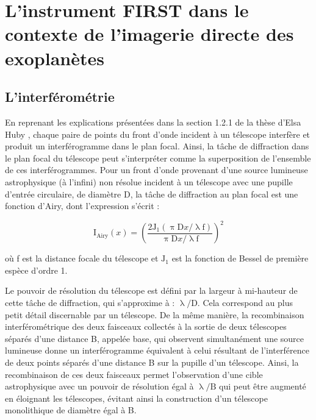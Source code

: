 \section{L'instrument FIRST dans le contexte de l'imagerie directe des exoplanètes}

\subsection{L'interférométrie}

En reprenant les explications présentées dans la section 1.2.1 de la thèse d'Elsa Huby \citep{huby2013these}, chaque paire de points du front d'onde incident à un télescope interfère et produit un interférogramme dans le plan focal. Ainsi, la tâche de diffraction dans le plan focal du télescope peut s'interpréter comme la superposition de l'ensemble de ces interférogrammes. Pour un front d'onde provenant d'une source lumineuse astrophysique (à l'infini) non résolue incident à un télescope avec une pupille d'entrée circulaire, de diamètre D, la tâche de diffraction au plan focal est une fonction d'Airy, dont l'expression s'écrit :

\begin{equation}
    \text{I}_{\text{Airy}}(x) = \left( \frac{2 \text{J}_{1} (\uppi \text{D}x / \uplambda \text{f})}{\uppi \text{D}x / \uplambda \text{f}} \right)^2
\end{equation}

\noindent où f est la distance focale du télescope et $\text{J}_{1}$ est la fonction de Bessel de première espèce d'ordre 1.

Le pouvoir de résolution du télescope est défini par la largeur à mi-hauteur de cette tâche de diffraction, qui s'approxime à : $\uplambda / \text{D}$. Cela correspond au plus petit détail discernable par un télescope. De la même manière, la recombinaison interférométrique des deux faisceaux collectés à la sortie de deux télescopes séparés d'une distance B, appelée base, qui observent simultanément une source lumineuse donne un interférogramme équivalent à celui résultant de l'interférence de deux points séparés d'une distance B sur la pupille d'un télescope. Ainsi, la recombinaison de ces deux faisceaux permet l'observation d'une cible astrophysique avec un pouvoir de résolution égal à $\uplambda / \text{B}$ qui peut être augmenté en éloignant les télescopes, évitant ainsi la construction d'un télescope monolithique de diamètre égal à B.

